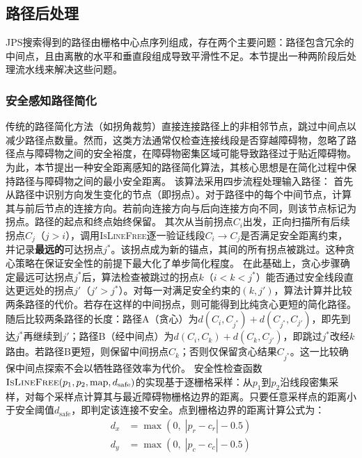 \documentclass[lettersize,journal]{IEEEtran}
\begin{document}
\subsection{路径后处理}
\label{subsec:post}
JPS搜索得到的路径由栅格中心点序列组成，存在两个主要问题：路径包含冗余的中间点，且由离散的水平和垂直段组成导致平滑性不足。本节提出一种两阶段后处理流水线来解决这些问题。
\subsubsection{安全感知路径简化}
传统的路径简化方法（如拐角裁剪）直接连接路径上的非相邻节点，跳过中间点以减少路径点数量。然而，这类方法通常仅检查连接线段是否穿越障碍物，忽略了路径点与障碍物之间的安全裕度，在障碍物密集区域可能导致路径过于贴近障碍物。为此，本节提出一种安全距离感知的路径简化算法，其核心思想是在简化过程中保持路径与障碍物之间的最小安全距离。
该算法采用四步流程处理输入路径：
首先从路径中识别方向发生变化的节点（即拐点）。对于路径中的每个中间节点，计算其与前后节点的连接方向。若前向连接方向与后向连接方向不同，则该节点标记为拐点。路径的起点和终点始终保留。
其次从当前拐点$C_i$出发，正向扫描所有后续拐点$C_j$（$j > i$），调用\textsc{IsLineFree}逐一验证线段$C_i \to C_j$是否满足安全距离约束，并记录\textbf{最远的}可达拐点$j^{*}$。该拐点成为新的锚点，其间的所有拐点被跳过。这种贪心策略在保证安全性的前提下最大化了单步简化程度。
在此基础上，贪心步骤确定最远可达拐点$j^{*}$后，算法检查被跳过的拐点$k$（$i < k < j^{*}$）能否通过安全线段直达更远处的拐点$j'$（$j' > j^{*}$）。对每一对满足安全约束的$(k, j')$，算法计算并比较两条路径的代价。若存在这样的中间拐点，则可能得到比纯贪心更短的简化路径。
随后比较两条路径的长度：路径A（贪心）为$d(C_i, C_{j^{*}}) + d(C_{j^{*}}, C_{j'})$，即先到达$j^{*}$再继续到$j'$；路径B（经中间点）为$d(C_i, C_k) + d(C_k, C_{j'})$，即跳过$j^{*}$改经$k$路由。若路径B更短，则保留中间拐点$C_k$；否则仅保留贪心结果$C_{j^{*}}$。这一比较确保中间点探索不会以牺牲路径效率为代价。
安全性检查函数$\textsc{IsLineFree}(p_1, p_2, \mathrm{map}, d_{\mathrm{safe}})$的实现基于逐栅格采样：从$p_1$到$p_2$沿线段密集采样，对每个采样点计算其与最近障碍物栅格边界的距离。只要任意采样点的距离小于安全阈值$d_{\mathrm{safe}}$，即判定该连接不安全。点到栅格边界的距离计算公式为：
\begin{equation}
\begin{split}
d_x &= \max\left(0,\; |p_r - c_r| - 0.5\right)\\
d_y &= \max\left(0,\; |p_c - c_c| - 0.5\right)
\end{split}
\label{eq:dxymax}
\end{equation}
\end{document}
